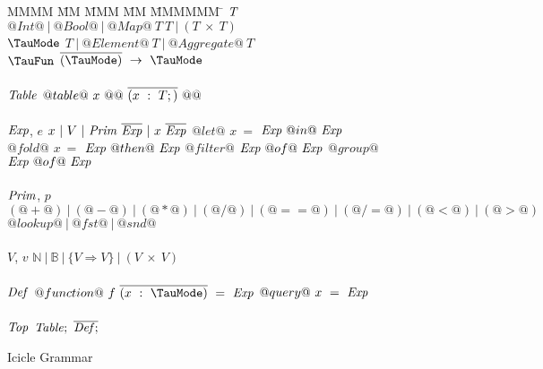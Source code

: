 
\begin{figure}

\begin{tabbing}
MMMM \= MM \= MMM \= MM \= MMMMMM \= \kill
$\mathit{T}$
\GrammarDefTab
  $@Int@~|~@Bool@~|~@Map@~T~T~|~(T~\times~T)$
\\
$\mi{\TauMode}$
\GrammarDefTab
  $T~|~@Element@~T~|~@Aggregate@~T$
\\
$\mi{\TauFun}$
\GrammarDefTab
  $\ov{(\TauMode)}~\to~\TauMode$
\\
\\

$\mathit{Table}$
\GrammarDefTab
  $@table@~x~@{@~\overline{(x~:~T;)}~@}@$
\\
\\

$\mathit{Exp}$, $e$
\GrammarDefTab
  $x~|~V~|~\mathit{Prim}~\overline{\mathit{Exp}}~|~x~\overline{\mathit{Exp}}$
\GrammarAlt
  $@let@$   \> $x~=$ \> $\mathit{Exp}~@  in@~\mathit{Exp}$
\GrammarAlt
  $@fold@$  \> $x~=$ \> $\mathit{Exp}~@then@~\mathit{Exp}$
\GrammarAlt
  $@filter@$\> \> $\mathit{Exp}~@  of@~\mathit{Exp}$
\GrammarAlt
  $@group@$ \> \> $\mathit{Exp}~@  of@~\mathit{Exp}$
\\
\\

$\mathit{Prim}$, $p$
\GrammarDefTab
  $(@+@)~|~(@-@)~|~(@*@)~|~(@/@)~|~(@==@)~|~(@/=@)~|~(@<@)~|~(@>@)$
\GrammarAlt
  $@lookup@~|~@fst@~|~@snd@$
\\
\\

$V$, $v$
\GrammarDefTab
 $\mathbb{N}~|~\mathbb{B}~|~\{V \Rightarrow V\}~|~(V~\times~V)$
\\
\\


$\mathit{Def}$
\GrammarDefTab
  $@function@~f~\ov{(x~:~\TauMode)}~=~\mi{Exp}$
\GrammarAlt
  $@query@~x~=~\mathit{Exp}$
\\
\\
$\mathit{Top}$
\GrammarDefTab
  $\mathit{Table};~\overline{\mathit{Def};}$
\end{tabbing}

\caption{Icicle Grammar}
\label{icicle:fig:source:grammar}
\end{figure}

